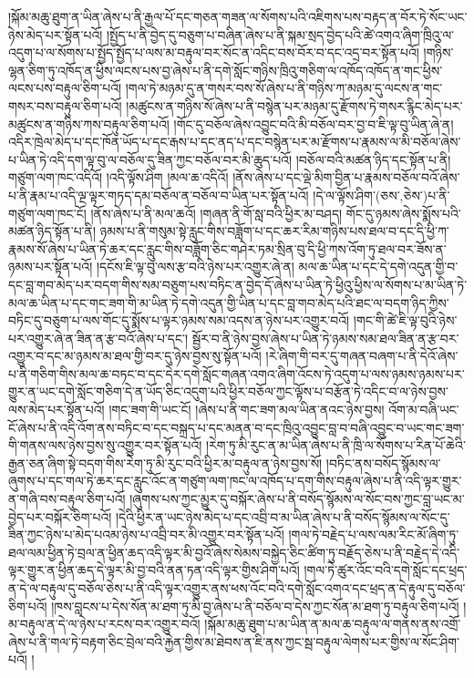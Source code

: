 །སྐོམ་མཆུ་ཐུག་ན་ཡིན་ཞེས་པ་ནི་རྒྱལ་པོ་དང་གཅན་གཟན་ལ་སོགས་པའི་འཇིགས་པས་བརྟད་ན་བོར་ཏེ་སོང་ཡང་ཉེས་མེད་པར་སྟོན་པའོ། །སྤྱོད་པ་ནི་བྱེད་དུ་བཅུག་པ་བཞིན་ཞེས་པ་ནི་སྐམ་སྲད་བྱེད་པའི་ཚེ་འགའ་ཞིག་ཁྲིའུ་ལ་འདུག་པ་ལ་སོགས་པ་སྤྱོད་སྤྱོད་པ་ལས་མ་བརྟུལ་བར་སོང་ན་འདིང་བས་བོར་བ་དང་འདྲ་བར་སྟོན་པའོ། །གཉིས་ལྷན་ཅིག་ཏུ་འཁོད་ན་ཕྱིས་ལངས་པས་བྱ་ཞེས་པ་ནི་དགེ་སློང་གཉིས་ཁྲིའུ་གཅིག་ལ་འཁོད་འཁོད་ན་གང་ཕྱིས་ལངས་པས་བརྟུལ་ཅིག་པའོ། །གལ་ཏེ་མཉམ་དུ་ན་གསར་བས་སོ་ཞེས་པ་ནི་གཉིས་ཀ་མཉམ་དུ་ལངས་ན་གང་གསར་བས་བརྟུལ་ཅིག་པའོ། །མཚུངས་ན་གཉིས་སོ་ཞེས་པ་ནི་བསྙེན་པར་མཉམ་དུ་རྫོགས་ཏེ་གསར་རྙིང་མེད་པར་མཚུངས་ན་གཉིས་ཀས་བརྟུལ་ཅིག་པའོ། །གོང་དུ་བཅོལ་ཞེས་འབྱུང་བའི་མི་བཅོལ་བར་བྱ་བ་ཇི་ལྟ་བུ་ཡིན་ཞེ་ན། འདིར་ཁྲེལ་མེད་པ་དང་ཁོན་ཡོད་པ་དང་རྒས་པ་དང་ནད་པ་དང་བསྙེན་པར་མ་རྫོགས་པ་རྣམས་ལ་མི་བཅོལ་ཞེས་པ་ཡིན་ཏེ་འདི་དག་ལྟ་བུ་ལ་བཅོལ་དུ་ཟིན་ཀྱང་བཅོལ་བར་མི་ཆུད་པའོ། །བཅོལ་བའི་མཚན་ཉིད་དང་སྟོན་པ་ནི། གཙུག་ལག་ཁང་འདིའོ། །འདི་ལྟོས་ཤིག །མལ་ཆ་འདིའོ། །ནོས་ཞེས་པ་དང་ལྡེ་མིག་བྱིན་པ་རྣམས་བཅོལ་བའོ་ཞེས་པ་ནི་རྣམ་པ་འདི་ལྔ་ལྟར་གཏད་དམ་བཅོལ་ན་བཅོལ་བ་ཡིན་པར་སྟོན་པའོ། །དེ་ལ་ལྟོས་ཤིག་(ཅས་‚ཅེས་)པ་ནི་གཙུག་ལག་ཁང་ངོ། །ནོས་ཞེས་པ་ནི་མལ་ཆའོ། །གཞན་ནི་གོ་སླ་བའི་ཕྱིར་མ་བཤད། གོང་དུ་ཉམས་ཞེས་སྨོས་པའི་མཚན་ཉིད་སྟོན་པ་ནི། ཉམས་པ་ནི་གསུམ་སྟེ་རླུང་གིས་བཟློག་པ་དང་ཆར་རིམ་གཉིས་པས་ཐལ་བ་དང་དི་ཕྱི་ཀ་རྣམས་སོ་ཞེས་པ་ཡིན་ཏེ་ཆར་དང་རླུང་གིས་བཟློག་ཅིང་གཤེར་ཏམ་སྲིན་བུ་དི་ཕྱི་ཀས་འོག་ཏུ་ཐལ་བར་ཟོས་ན་ཉམས་པར་སྟོན་པའོ། །དངོས་ཇི་ལྟ་བུ་ལས་རྩ་བའི་ཉེས་པར་འགྱུར་ཞེ་ན། མལ་ཆ་ཡིན་པ་དང་དེ་དགེ་འདུན་གྱི་བ་དང་བླ་གབ་མེད་པར་བདག་གིས་སམ་བཅུག་པས་བཏིང་ན་བྱེད་དོ་ཞེས་པ་ཡིན་ཏེ་ཕྱིའུ་ཕྱིས་ལ་སོགས་པ་མ་ཡིན་ཏེ་མལ་ཆ་ཡིན་པ་དང་གང་ཟག་གི་མ་ཡིན་ཏེ་དགེ་འདུན་གྱི་ཡིན་པ་དང་བླ་གབ་མེད་པའི་ཐང་ལ་བདག་ཉིད་ཀྱིས་བཏིང་དུ་བཅུག་པ་ལས་གོང་དུ་སྨོས་པ་ལྟར་ཉམས་སམ་འདས་ན་ཉེས་པར་འགྱུར་བའོ། །གང་གི་ཚེ་ཇི་ལྟ་བུའི་ཉེས་པར་འགྱུར་ཞེ་ན་ཟིན་ན་རྩ་བའོ་ཞེས་པ་དང་། སྦྱོར་བ་ནི་ཉེས་བྱས་ཞེས་པ་ཡིན་ཏེ་ཉམས་སམ་ཐལ་ཟིན་ན་རྩ་བར་འགྱུར་བ་དང་མ་ཉམས་མ་ཐལ་གྱི་བར་དུ་ཉེས་བྱས་སུ་སྟོན་པའོ། །རེ་ཞིག་གི་བར་དུ་གཞན་བཞག་པ་ནི་དེའོ་ཞེས་པ་ནི་གཅིག་གིས་མལ་ཆ་བཏང་བ་དང་དེར་དགེ་སློང་གཞན་འགའ་ཞིག་འོངས་ཏེ་འདུག་པ་ལས་ཉམས་ཉམས་པར་གྱུར་ན་ཡང་དགེ་སློང་གཅིག་དེ་ན་ཡོད་ཅིང་འདུག་པའི་ཕྱིར་བཅོལ་ཀྱང་ལྟོས་པ་བརྩོན་ཏེ་འདིང་བ་ལ་ཉེས་བྱས་ལས་མེད་པར་སྟོན་པའོ། །གང་ཟག་གི་ཡང་ངོ། །ཞེས་པ་ནི་གང་ཟག་མལ་ཡིན་ནའང་ཉེས་བྱས། འོག་མ་བཞི་ཡང་ངོ་ཞེས་པ་ནི་འདི་འོག་ནས་བཏིང་བ་དང་བསྐྲད་པ་དང་མནན་བ་དང་ཁྲིའུ་འབྱུང་བླ་བ་བཞི་འབྱུང་བ་ཡང་གང་ཟག་གི་གནས་ལས་ཉེས་བྱས་སུ་འགྱུར་བར་སྟོན་པའོ། །རེག་ཏུ་མི་རུང་ན་མ་ཡིན་ཞེས་པ་ནི་ཁྲི་ལ་སོགས་པ་རིན་པོ་ཆེའི་རྒྱན་ཅན་ཞིག་སྟེ་བདག་གིས་རེག་ཏུ་མི་རུང་བའི་ཕྱིར་མ་བརྟུལ་ན་ཉེས་བྱས་སོ། །བཏིང་ནས་བསོད་སྙོམས་ལ་ཞུགས་པ་དང་གལ་ཏེ་ཆར་དང་རླུང་འོང་ན་གཙུག་ལག་ཁང་ལ་འཁོད་པ་དག་གིས་བརྟུལ་ཞེས་པ་ནི་འདི་ལྟར་གྱུར་ན་གཞི་བས་བརྟུལ་ཅིག་པའོ། །ཞུགས་པས་ཀྱང་མྱུར་དུ་བསྐོར་ཞེས་པ་ནི་བསོད་སྙོམས་ལ་སོང་བས་ཀྱང་བླ་ཡང་མ་བྱེད་པར་བསྐོར་ཅིག་པའོ། །དེའི་ཕྱིར་ན་ཡང་ཉེས་མེད་པ་དང་འབྲི་བ་མ་ཡིན་ཞེས་པ་ནི་བསོད་སྙོམས་ལ་སོང་དུ་ཟིན་ཀྱང་ཉེས་པ་མེད་པའམ་ཉེས་པ་འབྲི་བར་མི་འགྱུར་བར་སྟོན་པའོ། །གལ་ཏེ་བརྗེད་པ་ལས་ལམ་རིང་མོ་ཞིག་ཏུ་ཐལ་ལམ་ཕྱིན་ཏེ་བྲལ་ན་ཕྱིན་ཆད་འདི་ལྟར་མི་བྱའོ་ཞེས་སེམས་བསྐྱེད་ཅིང་ཚིག་ཏུ་བརྗོད་ཅེས་པ་ནི་བརྗེད་དེ་འདི་ལྟར་གྱུར་ན་ཕྱིན་ཆད་དེ་ལྟར་མི་བྱ་བའི་ནན་ཏན་འདི་ལྟར་གྱིས་ཤིག་པའོ། །གལ་ཏེ་ཚུར་འོང་བའི་དགེ་སློང་དང་ཕྲད་ན་དེ་ལ་བརྟུལ་དུ་བཅོལ་ཅེས་པ་ནི་འདི་ལྟར་འགྱུར་ནས་ཕས་འོང་བའི་དགེ་སློང་འགའ་དང་ཕྲད་ན་དེ་རྟུལ་དུ་བཅོལ་ཅིག་པའོ། །ཁས་བླངས་པ་དེས་སོན་མ་ཐག་ཏུ་མི་བྱ་ཞེས་པ་ནི་བཅོལ་བ་དེས་ཀྱང་སོན་མ་ཐག་ཏུ་བརྟུལ་ཅིག་པའོ། །མ་བརྟུལ་ན་དེ་ལ་ཉེས་པ་རངས་བར་འགྱུར་བའོ། །སྐོམ་མཆུ་ཐུག་པ་མ་ཡིན་ན་མལ་ཆ་བརྟུལ་ལ་གནས་ནས་འགྲོ་ཞེས་པ་ནི་གལ་ཏེ་བརྟག་ཅིང་བྲེལ་བའི་རྐྱེན་གྱིས་མ་ཐེབས་ན་ཇི་ནས་ཀྱང་སྦ་བརྟུལ་ལེགས་པར་གྱིས་ལ་སོང་ཤིག་པའོ། །
